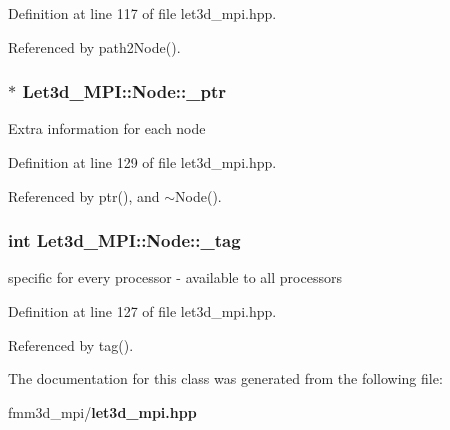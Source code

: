 Definition at line 117 of file let3d\_\-mpi.hpp.

Referenced by path2Node().
\subsubsection{$\ast$ {\bf Let3d\_\-MPI::Node::\_\-ptr}\hspace{0.3cm}{\tt  [protected]}}\label{classLet3d__MPI_1_1Node_ed0cfb365dac6bfe43badc9baabeacee_ed0cfb365dac6bfe43badc9baabeacee}


Extra information for each node 

Definition at line 129 of file let3d\_\-mpi.hpp.

Referenced by ptr(), and $\sim$Node().
\subsubsection{\setlength{\rightskip}{0pt plus 5cm}int {\bf Let3d\_\-MPI::Node::\_\-tag}\hspace{0.3cm}{\tt  [protected]}}\label{classLet3d__MPI_1_1Node_77940a0de3087721104e2e1139652c36_77940a0de3087721104e2e1139652c36}


specific for every processor - available to all processors 

Definition at line 127 of file let3d\_\-mpi.hpp.

Referenced by tag().

The documentation for this class was generated from the following file:\begin{CompactItemize}
\item 
fmm3d\_\-mpi/{\bf let3d\_\-mpi.hpp}\end{CompactItemize}
